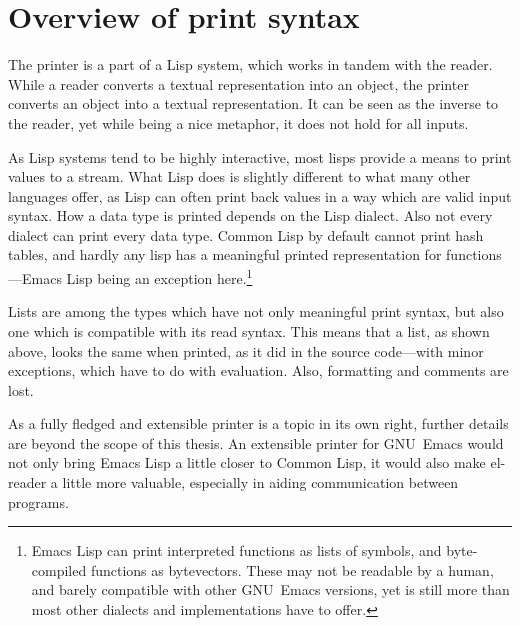 \documentclass[a4paper,10pt,twoside]{report}
\newcommand{\el}{Emacs Lisp}
\newcommand{\cl}{Common Lisp}
\newcommand{\elr}{el-reader}
\newcommand{\emacs}{GNU~Emacs}
\begin{document}

\section{Overview of print syntax}
\label{subsec:print-syntax}

The printer is a part of a Lisp system, which works in tandem with the reader.
While a reader converts a textual representation into an object, the printer
converts an object into a textual representation.  It can be seen as the inverse
to the reader, yet while being a nice metaphor, it does not hold for all inputs.

As Lisp systems tend to be highly interactive, most lisps provide a means to
print values to a stream.  What Lisp does is slightly different to what many
other languages offer, as Lisp can often print back values in a way which are
valid input syntax.  How a data type is printed depends on the Lisp dialect.
Also not every dialect can print every data type.  Common Lisp by default cannot
print hash tables, and hardly any lisp has a meaningful printed representation
for functions---\el{} being an exception here.\footnote{\el{} can print
  interpreted functions as lists of symbols, and byte-compiled functions as
  bytevectors.  These may not be readable by a human, and barely compatible with
  other \emacs{} versions, yet is still more than most other dialects and
  implementations have to offer.}

Lists are among the types which have not only meaningful print syntax, but also
one which is compatible with its read syntax.  This means that a list, as shown
above, looks the same when printed, as it did in the source code---with minor
exceptions, which have to do with evaluation.  Also, formatting and comments are
lost.

As a fully fledged and extensible printer is a topic in its own right, further
details are beyond the scope of this thesis.  An extensible printer for \emacs{}
would not only bring \el{} a little closer to \cl{}, it would also make \elr{} a
little more valuable, especially in aiding communication between programs.

\end{document}
